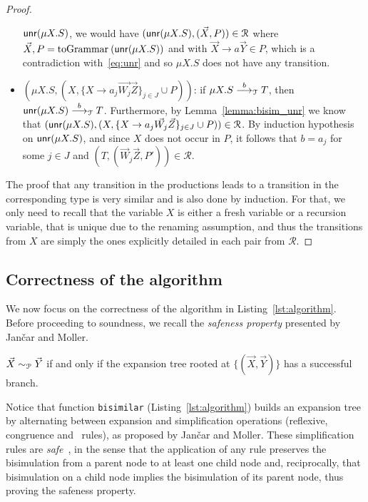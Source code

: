 \begin{proof}
\begin{itemize}
    	$\Unravel(\mu X.S)$, we would have $(\Unravel(\mu X.S), (\vec X, P))
    	\in \mathcal{R}$
    	where $\vec X, P = \toGrammarf{(\Unravel(\mu X.S))}$ and with
    	$\vec X \rightarrow a \vec Y \in P$, which is a contradiction 
    	with~\eqref{eq:unr} and so $\mu X.S$ does not have any transition.
    	\item $(\mu X.S, (X, \{X \rightarrow a_j \vec {W_j}\vec Z\}_{j\in J} \cup  P))$: 
    	if $\mu X.S\LTSderives[b] T$, then $\Unravel(\mu X.S)\LTSderives[b] T$.
    	Furthermore, by Lemma~\ref{lemma:bisim_unr} we know that 
    	$(\Unravel(\mu X.S), (X, \{X \rightarrow a_j \vec {W_j}\vec Z\}_{j\in J} \cup  P))
    	\in\mathcal{R}$. By induction hypothesis on $\Unravel(\mu X.S)$, 
    	and since $X$ does not occur in $P$, it follows 
    	that $b=a_j$ for some $j\in J$ and $(T, (\vec W_j \vec Z, P'))\in \mathcal{R}$.
	\end{itemize} 
	The proof that any transition in the productions leads to a transition in 
	the corresponding type is very similar and is also done by induction. 
	For that,
	we only need to recall that the variable $X$ is either 
	a fresh variable or a recursion variable, that is unique due to the
	renaming assumption, and thus
	the transitions from $X$ are simply the ones explicitly detailed in each 
	pair from $\mathcal{R}$.
\end{proof}

\subsection{Correctness of the algorithm}

We now focus on the correctness of the algorithm in
Listing~\ref{lst:algorithm}.  Before proceeding to soundness, we
recall the \emph{safeness property} presented by Jan{\v{c}}ar and
Moller.

\begin{proposition} 
  \label{prop:safeness}
  $\vec X \ProdEquiv \vec Y$ if and only if the expansion tree rooted
  at $\{(\vec X, \vec Y)\}$ has a successful branch.
\end{proposition}

Notice that function \lstinline|bisimilar|
(Listing~\ref{lst:algorithm}) builds an expansion tree by alternating
between expansion and simplification operations (reflexive,
congruence and \BPA\ rules), as proposed by Jan{\v{c}}ar and Moller.
%
These simplification rules are \emph{safe}~\cite{janvcar1999techniques}, in the sense that the
application of any rule preserves the bisimulation from a parent node
to at least one child node and, reciprocally, that bisimulation on a
child node implies the bisimulation of its parent node, thus proving
the safeness property.

